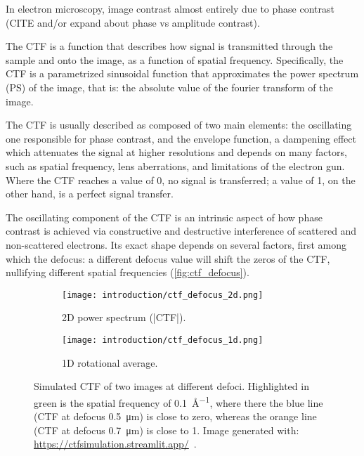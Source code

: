 In electron microscopy, image contrast almost entirely due to phase contrast (CITE and/or expand about phase vs amplitude contrast).

The CTF is a function that describes how signal is transmitted through the sample and onto the image, as a function of spatial frequency. Specifically, the CTF is a parametrized sinusoidal function that approximates the power spectrum (PS) of the image, that is: the absolute value of the fourier transform of the image.

The CTF is usually described as composed of two main elements: the oscillating one responsible for phase contrast, and the envelope function, a dampening effect which attenuates the signal at higher resolutions and depends on many factors, such as spatial frequency, lens aberrations, and limitations of the electron gun. Where the CTF reaches a value of \num{0}, no signal is transferred; a value of \num{1}, on the other hand, is a perfect signal transfer.

The oscillating component of the CTF is an intrinsic aspect of how phase contrast is achieved via constructive and destructive interference of scattered and non-scattered electrons. Its exact shape depends on several factors, first among which the defocus: a different defocus value will shift the zeros of the CTF, nullifying different spatial frequencies (\autoref{fig:ctf_defocus}).

\begin{figure}[ht]
    \centering
    \begin{subfigure}{.6\textwidth}
        \centering
        \texttt{[image: introduction/ctf\_defocus\_2d.png]}
        \caption{2D power spectrum (|CTF|).}
        \label{fig:ctf_defocus_2d}
    \end{subfigure}%

    \begin{subfigure}{\textwidth}
        \centering
        \texttt{[image: introduction/ctf\_defocus\_1d.png]}
        \caption{1D rotational average.}
        \label{fig:ctf_defocus_1d}
    \end{subfigure}%

    \caption[CTF: effect of defocus]{Simulated CTF of two images at different defoci. Highlighted in green is the spatial frequency of \qty{0.1}{\angstrom^{-1}}, where there the blue line (CTF at defocus \qty{0.5}{\micro\meter}) is close to zero, whereas the orange line (CTF at defocus \qty{0.7}{\micro\meter}) is close to 1. Image generated with: \url{https://ctfsimulation.streamlit.app/}~\cite{jiangWebbasedSimulationContrast2001}.}
    \label{fig:ctf_defocus}
\end{figure}

